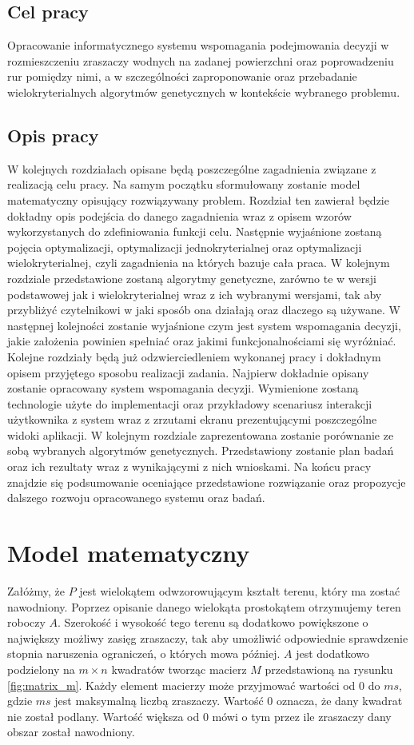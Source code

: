 \documentclass[twoside]{iisthesis}
\begin{document}
\section{Cel pracy}
Opracowanie informatycznego systemu wspomagania podejmowania decyzji w rozmieszczeniu zraszaczy wodnych na zadanej powierzchni oraz poprowadzeniu rur pomiędzy nimi, a w szczególności zaproponowanie oraz przebadanie wielokryterialnych algorytmów genetycznych w kontekście wybranego problemu.

\section{Opis pracy}
W kolejnych rozdziałach opisane będą poszczególne zagadnienia związane z realizacją celu pracy. Na samym początku sformułowany zostanie model matematyczny opisujący rozwiązywany problem. Rozdział ten zawierał będzie dokładny opis podejścia do danego zagadnienia wraz z opisem wzorów wykorzystanych do zdefiniowania funkcji celu. Następnie wyjaśnione zostaną pojęcia optymalizacji, optymalizacji jednokryterialnej oraz optymalizacji wielokryterialnej, czyli zagadnienia na których bazuje cała praca. W kolejnym rozdziale przedstawione zostaną algorytmy genetyczne, zarówno te w wersji podstawowej jak i wielokryterialnej wraz z ich wybranymi wersjami, tak aby przybliżyć czytelnikowi w jaki sposób ona działają oraz dlaczego są używane. W następnej kolejności zostanie wyjaśnione czym jest system wspomagania decyzji, jakie założenia powinien spełniać oraz jakimi funkcjonalnościami się wyróżniać. Kolejne rozdziały będą już odzwierciedleniem wykonanej pracy i dokładnym opisem przyjętego sposobu realizacji zadania. Najpierw dokładnie opisany zostanie opracowany system wspomagania decyzji. Wymienione zostaną technologie użyte do implementacji oraz przykładowy scenariusz interakcji użytkownika z system wraz z zrzutami ekranu prezentującymi poszczególne widoki aplikacji. W kolejnym rozdziale zaprezentowana zostanie porównanie ze sobą wybranych algorytmów genetycznych. Przedstawiony zostanie plan badań oraz ich rezultaty wraz z wynikającymi z nich wnioskami. Na końcu pracy znajdzie się podsumowanie oceniające przedstawione rozwiązanie oraz propozycje dalszego rozwoju opracowanego systemu oraz badań.

\chapter{Model matematyczny}
Załóżmy, że $P$ jest wielokątem odwzorowującym kształt terenu, który ma zostać nawodniony. Poprzez opisanie danego wielokąta prostokątem otrzymujemy teren roboczy $A$. Szerokość i wysokość tego terenu są dodatkowo powiększone o największy możliwy zasięg zraszaczy, tak aby umożliwić odpowiednie sprawdzenie stopnia naruszenia ograniczeń, o których mowa później. $A$ jest dodatkowo podzielony na $m \times n$ kwadratów tworząc macierz $M$ przedstawioną na rysunku \eqref{fig:matrix_m}. Każdy element macierzy może przyjmować wartości od 0 do $ms$, gdzie $ms$ jest maksymalną liczbą zraszaczy. Wartość 0 oznacza, że dany kwadrat nie został podlany. Wartość większa od 0 mówi o tym przez ile zraszaczy dany obszar został nawodniony.
\end{document}
